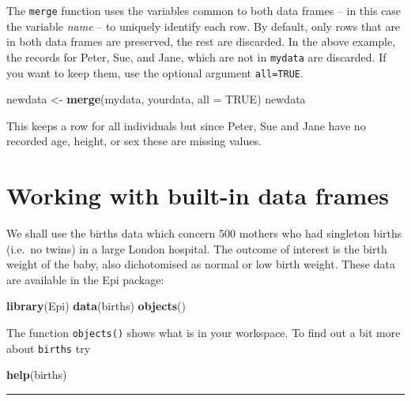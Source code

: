 \documentclass[
]{book}
\newenvironment{Shaded}{\begin{snugshade}}{\end{snugshade}}
\newcommand{\AttributeTok}[1]{\textcolor[rgb]{0.13,0.29,0.53}{#1}}
\newcommand{\ConstantTok}[1]{\textcolor[rgb]{0.56,0.35,0.01}{#1}}
\newcommand{\FunctionTok}[1]{\textcolor[rgb]{0.13,0.29,0.53}{\textbf{#1}}}
\newcommand{\NormalTok}[1]{#1}
\newcommand{\OtherTok}[1]{\textcolor[rgb]{0.56,0.35,0.01}{#1}}
\begin{document}
The \texttt{merge} function uses the variables common to both data
frames -- in this case the variable \emph{name} -- to uniquely identify
each row. By default, only rows that are in both data frames are
preserved, the rest are discarded. In the above example, the records
for Peter, Sue, and Jane, which are not in \texttt{mydata} are
discarded. If you want to keep them, use the optional argument \texttt{all=TRUE}.

\begin{Shaded}
\begin{Highlighting}[]
\NormalTok{newdata }\OtherTok{\textless{}{-}} \FunctionTok{merge}\NormalTok{(mydata, yourdata, }\AttributeTok{all =} \ConstantTok{TRUE}\NormalTok{)}
\NormalTok{newdata}
\end{Highlighting}
\end{Shaded}

This keeps a row for all individuals but since Peter, Sue and Jane
have no recorded age, height, or sex these are missing values.

\section{Working with built-in data frames}\label{working-with-built-in-data-frames}

We shall use the births data which concern 500 mothers who had
singleton births (i.e.~no twins) in a large London hospital. The
outcome of interest is the birth weight of the baby, also dichotomised
as normal or low birth weight. These data are available in the Epi
package:

\begin{Shaded}
\begin{Highlighting}[]
\FunctionTok{library}\NormalTok{(Epi)}
\FunctionTok{data}\NormalTok{(births)}
\FunctionTok{objects}\NormalTok{()}
\end{Highlighting}
\end{Shaded}

The function \texttt{objects()} shows what is in your workspace. To
find out a bit more about \texttt{births} try

\begin{Shaded}
\begin{Highlighting}[]
\FunctionTok{help}\NormalTok{(births)}
\end{Highlighting}
\end{Shaded}

\begin{center}\rule{0.5\linewidth}{0.5pt}\end{center}
\end{document}
